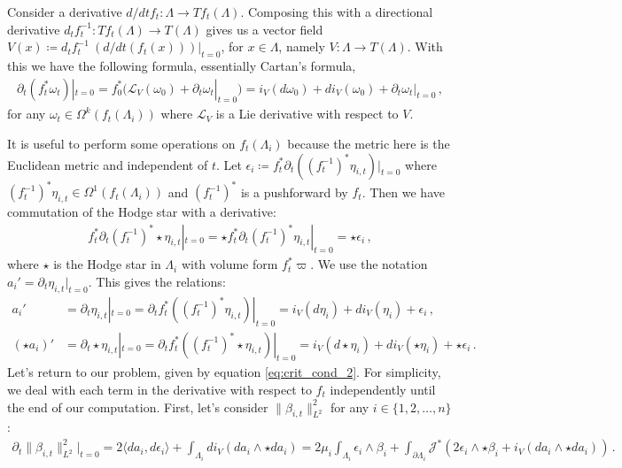 \documentclass[11pt]{article}
\theoremstyle{plain}
\theoremstyle{definition}
\theoremstyle{remark}
\newcommand{\ST}{\Lambda}
\begin{document}
Consider a derivative \(d/dt f_t : \ST \to T f_t(\ST) \). Composing this with a directional derivative \(d_t f_{t}^{-1} :T f_t(\ST) \to T (\ST) \) gives us a vector field \(V(x) \coloneqq d_t f_{t}^{-1} \ (d/dt (f_t(x))  )|_{t=0}\), for \(x \in \ST\), namely \(V:\ST \to T(\ST)\). With this we have the following formula, essentially Cartan's formula,
\begin{align*}
    \partial_t (f^*_t \omega_t) |_{t=0} = f^*_0 (\mathcal{L}_V (\omega_0) +  \partial_t \omega_t |_{t=0}) =  i_V (d\omega_0) + d i_V (\omega_0) + \partial_t \omega_t |_{t=0} \, ,
\end{align*}
for any \(\omega_t \in  \Omega^k (f_t(\ST_i) ) \) where \(\mathcal{L}_V\) is a Lie derivative with respect to \(V\). 

It is useful to perform some operations on \(f_t(\ST_i)\) because the metric here is the Euclidean metric and independent of \(t\). Let \(\epsilon_i \coloneqq f_t^* \partial_t ((f_t^{-1})^* \eta_{i,t}) |_{t=0}\) where \( (f_t^{-1})^* \eta_{i,t} \in  \Omega^1 (f_t(\ST_i))\) and \( (f_t^{-1})^*\) is a pushforward by \(f_t\). Then we have commutation of the Hodge star with a derivative: 
\begin{align*}
    f^*_t \partial_t (f_t^{-1})^* \star \eta_{i,t} |_{t=0} = \star f^*_t  \partial_t (f_t^{-1})^* \eta_{i,t} |_{t=0} = \star \epsilon_i \, ,
\end{align*}
where \(\star\) is the Hodge star in \(\ST_i\) with volume form \(f_t^* \varpi\). We use the notation \(a_i' = \partial_t \eta_{i,t}|_{t=0}\). This gives the relations:
\begin{align*}
    a_i' &= \partial_t \eta_{i,t}|_{t=0} = \partial_t  f_t^*  ((f_t^{-1})^* \eta_{i,t}) |_{t=0} = 
    i_V (d  \eta_{i}  ) + d i_V (  \eta_{i}  ) + \epsilon_i \, , \\
    (\star a_i)' &= \partial_t \star \eta_{i,t}|_{t=0} = \partial_t   f_t^*  (  (f_t^{-1})^*    \star \eta_{i,t} ) |_{t=0} = i_V ( d  \star \eta_{i}  ) + d i_V (  \star \eta_{i}  ) + \star \epsilon_i \, .
\end{align*}
Let's return to our problem, given by equation \eqref{eq:crit_cond_2}. For simplicity, we deal with each term in the derivative with respect to \(f_t\) independently until the end of our computation. First, let's consider \(\| \beta_{i,t}\|_{L^2}^2\) for any \(i \in \{1, 2, \dots, n\} \):
\begin{align*}
    \partial_t    \big\| \beta_{i,t}\big\|_{L^2}^2    \Big|_{t=0}   = 2  \langle da_i, d \epsilon_i \rangle + \! \int_{\ST_i} \! \! d i_V (da_i \wedge \star da_i) = 2 \mu_i \! \int_{\ST_i} \! \! \epsilon_i \wedge\beta_i + \! \int_{\partial \ST_i}  \! \! \mathcal{J}^* ( 2 \epsilon_i \wedge \star\beta_i +  i_V (da_i \wedge \star da_i ) ) \, .
\end{align*}
\end{document}
